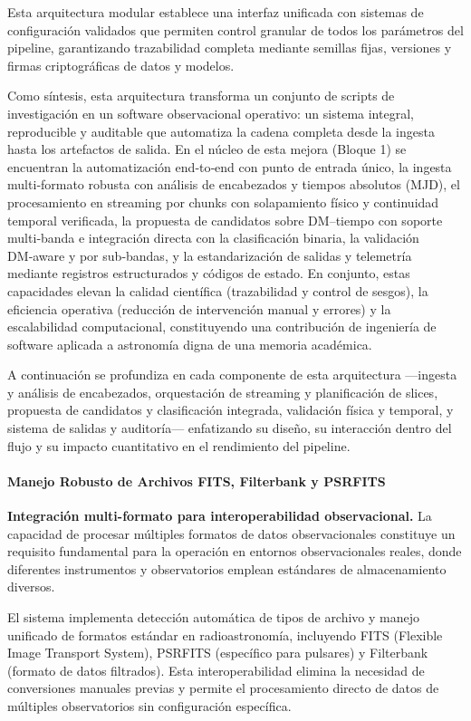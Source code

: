 Esta arquitectura modular establece una interfaz unificada con sistemas de configuración validados que permiten control granular de todos los parámetros del pipeline, garantizando trazabilidad completa mediante semillas fijas, versiones y firmas criptográficas de datos y modelos.

Como síntesis, esta arquitectura transforma un conjunto de scripts de investigación en un software observacional operativo: un sistema integral, reproducible y auditable que automatiza la cadena completa desde la ingesta hasta los artefactos de salida. En el núcleo de esta mejora (Bloque 1) se encuentran la automatización end‑to‑end con punto de entrada único, la ingesta multi‑formato robusta con análisis de encabezados y tiempos absolutos (MJD), el procesamiento en streaming por chunks con solapamiento físico y continuidad temporal verificada, la propuesta de candidatos sobre DM–tiempo con soporte multi‑banda e integración directa con la clasificación binaria, la validación DM‑aware y por sub‑bandas, y la estandarización de salidas y telemetría mediante registros estructurados y códigos de estado. En conjunto, estas capacidades elevan la calidad científica (trazabilidad y control de sesgos), la eficiencia operativa (reducción de intervención manual y errores) y la escalabilidad computacional, constituyendo una contribución de ingeniería de software aplicada a astronomía digna de una memoria académica.

A continuación se profundiza en cada componente de esta arquitectura —ingesta y análisis de encabezados, orquestación de streaming y planificación de slices, propuesta de candidatos y clasificación integrada, validación física y temporal, y sistema de salidas y auditoría— enfatizando su diseño, su interacción dentro del flujo y su impacto cuantitativo en el rendimiento del pipeline.

\paragraph{Manejo Robusto de Archivos FITS, Filterbank y PSRFITS}

\noindent\textbf{Integración multi-formato para interoperabilidad observacional.} La capacidad de procesar múltiples formatos de datos observacionales constituye un requisito fundamental para la operación en entornos observacionales reales, donde diferentes instrumentos y observatorios emplean estándares de almacenamiento diversos.

El sistema implementa detección automática de tipos de archivo y manejo unificado de formatos estándar en radioastronomía, incluyendo FITS (Flexible Image Transport System), PSRFITS (específico para pulsares) y Filterbank (formato de datos filtrados). Esta interoperabilidad elimina la necesidad de conversiones manuales previas y permite el procesamiento directo de datos de múltiples observatorios sin configuración específica.

